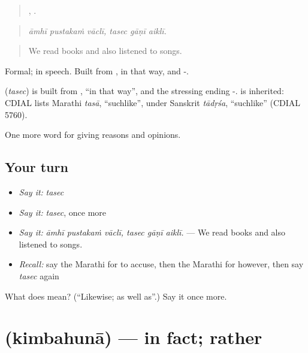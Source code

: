 \begin{quote}
  ,   .
\end{quote}

\begin{quote}
\emph{āmhī pustakaṁ vāclī, tasec gāṇī aiklī.}
\end{quote}

\begin{quote}
We read books and also listened to songs.
\end{quote}

Formal;  in speech. Built from , in that way, and -.

\begin{cousinweb}
\textbf{} (\emph{tasec}) is built from , \textquotedblleft{}in that way\textquotedblright{}, and the stressing ending -.  is inherited: CDIAL lists Marathi \emph{tasā}, \textquotedblleft{}suchlike\textquotedblright{}, under Sanskrit \emph{tādṛśa}, \textquotedblleft{}suchlike\textquotedblright{} (CDIAL 5760).
\end{cousinweb}

\begin{grammarlens}[title={What you've built}]
One more word for giving reasons and opinions.
\end{grammarlens}

\subsection*{Your turn}
\begin{itemize}
\raggedright
  \item \emph{Say it:} \emph{tasec}
  \item \emph{Say it:} \emph{tasec}, once more
  \item \emph{Say it:} \emph{āmhī pustakaṁ vāclī, tasec gāṇī aiklī.} — We read books and also listened to songs.
  \item \emph{Recall:} say the Marathi for to accuse, then the Marathi for however, then say \emph{tasec} again
\end{itemize}

\begin{tcolorbox}[breakable,colback=teal!4,colframe=teal!35!black,title={Before you move on}]
What does  mean? (\textquotedblleft{}Likewise; as well as\textquotedblright{}.) Say it once more.
\end{tcolorbox}
\section[\texorpdfstring{\mr{किंबहुना} (kimbahunā)}{किंबहुना (kimbahunā)}]{ (kimbahunā) — in fact; rather}

